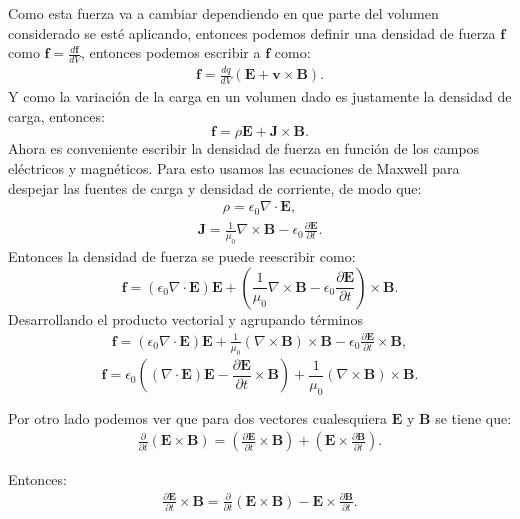 \documentclass[11pt,fleqn]{book} %
\begin{document}
Como esta fuerza va a cambiar dependiendo en que parte del volumen considerado se est\'e aplicando, entonces podemos definir una densidad de fuerza $\textbf{f}$ como $\textbf{f}=\frac{d \textbf{f}}{dV}$, entonces podemos escribir a $\textbf{f}$ como:
\begin{eqnarray*}
\textbf{f}=\frac{dq}{dV}(\textbf{E}+\textbf{v}\times\textbf{B}).
\end{eqnarray*}
Y como la variaci\'on de la carga en un volumen dado es justamente la densidad de carga, entonces:
\begin{equation}
\textbf{f}=\rho\textbf{E}+\textbf{J}\times\textbf{B}.
\end{equation}
Ahora es conveniente escribir la densidad de fuerza en funci\'on de los campos el\'ectricos y magn\'eticos. Para esto usamos las ecuaciones de Maxwell para despejar las fuentes de carga y densidad de corriente, de modo que:
\begin{eqnarray*}
\rho=\epsilon_{0}\nabla\cdot\textbf{E},
\end{eqnarray*}
\begin{eqnarray*}
\textbf{J}=\frac{1}{\mu_{0}}\nabla\times\textbf{B}-\epsilon_{0}\frac{\partial \textbf{E}}{\partial t}.
\end{eqnarray*}
Entonces la densidad de fuerza se puede reescribir como:
\begin{equation}
\textbf{f}=(\epsilon_{0}\nabla\cdot\textbf{E})\textbf{E}+\left( \frac{1}{\mu_{0}}\nabla\times\textbf{B}-\epsilon_{0}\frac{\partial \textbf{E}}{\partial t} \right)\times\textbf{B}.
\end{equation}
Desarrollando el producto vectorial y agrupando t\'erminos
\begin{eqnarray*}
\textbf{f}=(\epsilon_{0}\nabla\cdot\textbf{E})\textbf{E}+ \frac{1}{\mu_{0}}(\nabla\times\textbf{B})\times\textbf{B}-\epsilon_{0}\frac{\partial \textbf{E}}{\partial t} \times\textbf{B},
\end{eqnarray*}
\begin{equation}
\textbf{f}=\epsilon_{0}\left((\nabla\cdot\textbf{E})\textbf{E}-\frac{\partial \textbf{E}}{\partial t} \times\textbf{B}\right) +\frac{1}{\mu_{0}}(\nabla\times\textbf{B})\times\textbf{B}. \label{Desidad de Fuerza}
\end{equation}


\begin{obs}
Por otro lado podemos ver que para dos vectores cualesquiera $\textbf{E}$ y $\textbf{B}$ se tiene que:
\begin{eqnarray*}
\frac{\partial}{\partial t}(\textbf{E}\times\textbf{B})=\left( \frac{\partial\textbf{E}}{\partial t}\times\textbf{B}\right)+\left(\textbf{E}\times\frac{\partial\textbf{B}}{\partial t}\right).
\end{eqnarray*}

Entonces:
\begin{eqnarray*}
\frac{\partial\textbf{E}}{\partial t}\times\textbf{B}=\frac{\partial}{\partial t}(\textbf{E}\times\textbf{B})-\textbf{E}\times\frac{\partial\textbf{B}}{\partial t}.
\end{eqnarray*}
\end{obs}
\end{document}
